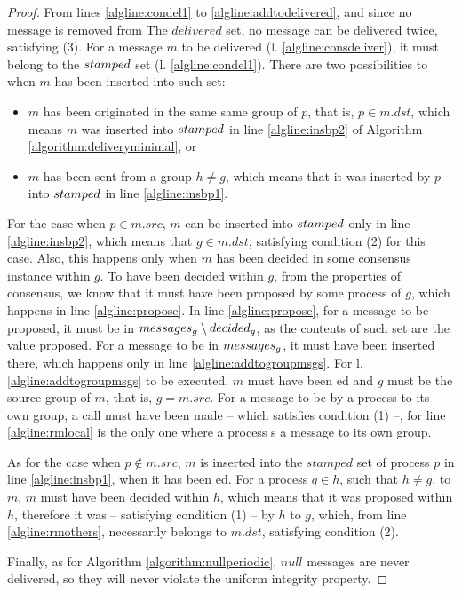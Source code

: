 \documentclass[times, 10pt]{article}
\begin{document}
\begin{proof}
From lines \ref{algline:condel1} to \ref{algline:addtodelivered}, and since no message is removed from The $delivered$ set, no message can be delivered twice, satisfying (3). For a message $m$ to be delivered (l. \ref{algline:consdeliver}), it must belong to the $stamped$ set (l. \ref{algline:condel1}).  There are two possibilities to when $m$ has been inserted into such set:
\begin{itemize}
  \item $m$ has been originated in the same same group of $p$, that is, $p \in m.dst$, which means $m$ was inserted into $stamped$ in line \ref{algline:insbp2} of Algorithm \ref{algorithm:deliveryminimal}, or
  \item $m$ has been sent from a group $h \neq g$, which means that it was inserted by $p$ into $stamped$ in line \ref{algline:insbp1}. 
\end{itemize}

For the case when $p \in m.src$, $m$ can be inserted into $stamped$ only in line \ref{algline:insbp2}, which means that $g \in m.dst$, satisfying condition (2) for this case. Also, this happens only when $m$ has been decided in some consensus instance within $g$. To have been decided within $g$, from the properties of consensus, we know that it must have been proposed by some process of $g$, which happens in line \ref{algline:propose}. In line \ref{algline:propose}, for a message to be proposed, it must be in $messages\text{$_g$} \setminus decided\text{$_g$}$, as the contents of such set are the value proposed. For a message to be in $messages\text{$_g$}$, it must have been inserted there, which happens only in line \ref{algline:addtogroupmsgs}. For l. \ref{algline:addtogroupmsgs} to be executed, $m$ must have been \rmdel{}ed and $g$ must be the source group of $m$, that is, $g = m.src$. For a message to be \rmcast{} by a process to its own group, a  call must have been made -- which satisfies condition (1) --, for line \ref{algline:rmlocal} is the only one where a process \rmcast{}s a message to its own group. 

As for the case when $p \notin m.src$, $m$ is inserted into the $stamped$ set of process $p$ in line \ref{algline:insbp1}, when it has been \rmdel{}ed. For a process $q \in h$, such that $h \neq g$, to \rmcast{} $m$, $m$ must have been decided within $h$, which means that it was proposed within $h$, therefore it was \amcast{} -- satisfying condition (1) -- by $h$ to $g$, which, from line \ref{algline:rmothers}, necessarily belongs to $m.dst$, satisfying condition (2).

Finally, as for Algorithm \ref{algorithm:nullperiodic}, $null$ messages are never delivered, so they will never violate the uniform integrity property.
\end{proof}
\end{document}
